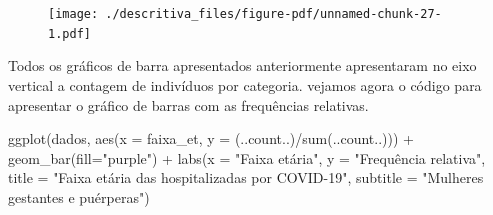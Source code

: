 \documentclass[
  letterpaper,
  DIV=11,
  numbers=noendperiod]{scrreprt}
\newenvironment{Shaded}{\begin{snugshade}}{\end{snugshade}}
\newcommand{\AttributeTok}[1]{\textcolor[rgb]{0.40,0.45,0.13}{#1}}
\newcommand{\CommentTok}[1]{\textcolor[rgb]{0.37,0.37,0.37}{#1}}
\newcommand{\FunctionTok}[1]{\textcolor[rgb]{0.28,0.35,0.67}{#1}}
\newcommand{\NormalTok}[1]{\textcolor[rgb]{0.00,0.23,0.31}{#1}}
\newcommand{\OtherTok}[1]{\textcolor[rgb]{0.00,0.23,0.31}{#1}}
\newcommand{\SpecialCharTok}[1]{\textcolor[rgb]{0.37,0.37,0.37}{#1}}
\newcommand{\StringTok}[1]{\textcolor[rgb]{0.13,0.47,0.30}{#1}}
\begin{document}
\begin{Shaded}
\end{Shaded}

\begin{figure}[H]

{\centering \texttt{[image: ./descritiva\_files/figure-pdf/unnamed-chunk-27-1.pdf]}

}

\end{figure}

Todos os gráficos de barra apresentados anteriormente apresentaram no
eixo vertical a contagem de indivíduos por categoria. vejamos agora o
código para apresentar o gráfico de barras com as frequências relativas.

\begin{Shaded}
\begin{Highlighting}[]
\FunctionTok{ggplot}\NormalTok{(dados, }\FunctionTok{aes}\NormalTok{(}\AttributeTok{x =}\NormalTok{ faixa\_et, }\AttributeTok{y =}\NormalTok{ (..count..)}\SpecialCharTok{/}\FunctionTok{sum}\NormalTok{(..count..))) }\SpecialCharTok{+}  
  \FunctionTok{geom\_bar}\NormalTok{(}\AttributeTok{fill=}\StringTok{"purple"}\NormalTok{) }\SpecialCharTok{+} 
  \FunctionTok{labs}\NormalTok{(}\AttributeTok{x =} \StringTok{"Faixa etária"}\NormalTok{, }\AttributeTok{y =} \StringTok{"Frequência relativa"}\NormalTok{, }\AttributeTok{title =} \StringTok{"Faixa etária das hospitalizadas por COVID{-}19"}\NormalTok{, }\AttributeTok{subtitle =} \StringTok{"Mulheres gestantes e puérperas"}\NormalTok{)}
\end{Highlighting}
\end{Shaded}
\end{document}

